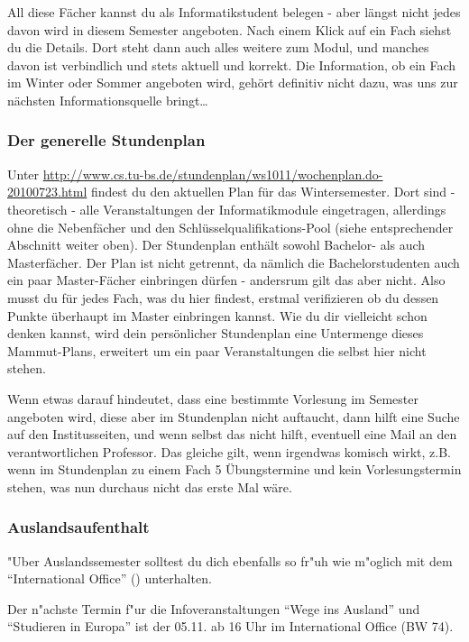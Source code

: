 All diese Fächer kannst du als Informatikstudent belegen - aber längst nicht jedes davon wird in diesem Semester angeboten. Nach einem Klick auf ein Fach siehst du die Details. Dort steht dann auch alles weitere zum Modul, und manches davon ist verbindlich und stets aktuell und korrekt. Die Information, ob ein Fach im Winter oder Sommer angeboten wird, gehört definitiv nicht dazu, was uns zur nächsten Informationsquelle bringt\ldots

\subsubsection{Der generelle Stundenplan}
Unter
\url{http://www.cs.tu-bs.de/stundenplan/ws1011/wochenplan.do-20100723.html}
findest du den aktuellen Plan für das Wintersemester. Dort sind -
theoretisch - alle Veranstaltungen der Informatikmodule eingetragen,
allerdings ohne die Nebenfächer und den Schlüsselqualifikations-Pool (siehe entsprechender Abschnitt weiter oben). Der Stundenplan enthält sowohl Bachelor- als auch Masterfächer. Der Plan ist nicht getrennt, da nämlich die Bachelorstudenten auch ein paar Master-Fächer einbringen dürfen - andersrum gilt das aber nicht. Also musst du für jedes Fach, was du hier findest, erstmal verifizieren ob du dessen Punkte überhaupt im Master einbringen kannst. Wie du dir vielleicht schon denken kannst, wird dein persönlicher Stundenplan eine Untermenge dieses Mammut-Plans, erweitert um ein paar Veranstaltungen die selbst hier nicht stehen.

Wenn etwas darauf hindeutet, dass eine bestimmte Vorlesung im Semester angeboten wird, diese aber im Stundenplan nicht auftaucht, dann hilft eine Suche auf den Institusseiten, und wenn selbst das nicht hilft, eventuell eine Mail an den verantwortlichen Professor. Das gleiche gilt, wenn irgendwas komisch wirkt, z.B. wenn im Stundenplan zu einem Fach 5 Übungstermine und kein Vorlesungstermin stehen, was nun durchaus nicht das erste Mal wäre.

\subsubsection{Auslandsaufenthalt}
"Uber Auslandssemester solltest du dich ebenfalls so fr"uh wie m"oglich mit dem "`International Office"' () unterhalten.

Der n"achste Termin f"ur die Infoveranstaltungen "`Wege ins Ausland"' und "`Studieren in Europa"' ist der 05.11. ab 16 Uhr im International Office (BW 74). 

